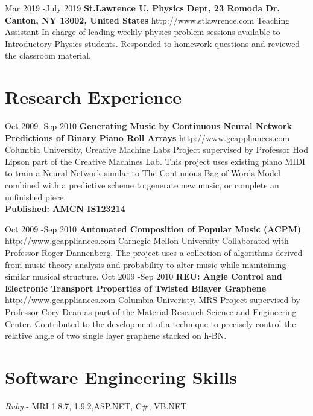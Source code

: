 \documentclass[10pt]{article} %
\begin{document}
\job
{Mar 2019 -}{July 2019}
{\bf{St.Lawrence U, Physics Dept}, \textnormal{23 Romoda Dr, Canton, NY 13002, United States}}
{http://www.stlawrence.com}
{Teaching Assistant}
{In charge of leading weekly physics problem sessions available to Introductory Physics students. Responded to homework questions and reviewed the classroom material. }


\section{Research Experience}

\job
{Oct 2009 -}{Sep 2010}
{\bf{Generating Music by Continuous Neural Network Predictions of Binary Piano Roll Arrays}}
{http://www.geappliances.com}
{Columbia University, Creative Machine Labs}
{Project supervised by Professor Hod Lipson part of the Creative Machines Lab. This project uses existing piano MIDI to train a Neural Network similar to The Continuous Bag of Words Model combined with a predictive scheme to generate new music, or complete an unfinished piece.
\\

\bf{Published: AMCN IS123214}}


\job
{Oct 2009 -}{Sep 2010}
{\bf{Automated Composition of Popular Music (ACPM) 
}}
{http://www.geappliances.com}
{Carnegie Mellon University}
{Collaborated with Professor Roger Dannenberg.  The project uses a collection of algorithms derived from music theory analysis and probability to alter music while maintaining similar musical structure.}
\job
{Oct 2009 -}{Sep 2010}
{\bf{REU: Angle Control and Electronic Transport Properties of Twisted Bilayer Graphene}}
{http://www.geappliances.com}
{Columbia Univeristy, MRS}
{Project supervised by Professor Cory Dean as part of the Material Research Science and Engineering Center. Contributed to the development of a technique to precisely control the relative angle of two single layer graphene stacked on h-BN.}


\section{Software Engineering Skills}

{
\textit{Ruby} - MRI 1.8.7, 1.9.2,ASP.NET, C\#, VB.NET
}
\end{document}
